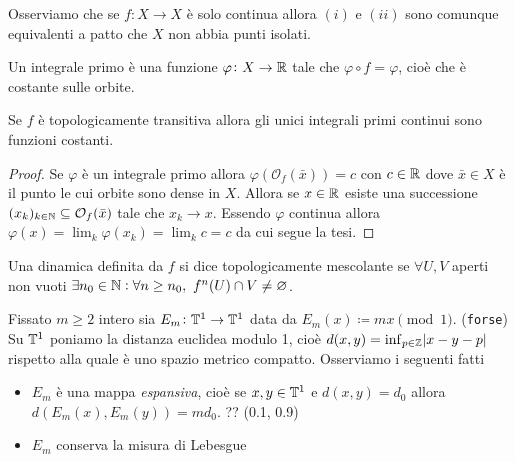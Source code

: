 Osserviamo che se $ f \colon X \to X $ è solo continua allora $ (i) $ e $ (ii) $ sono comunque equivalenti a patto che $ X $ non abbia punti isolati. \\

\begin{definition}
	Un integrale primo è una funzione $ \varphi \colon X \to \mathbb{R} $ tale che $ \varphi \circ f = \varphi $, cioè che è costante sulle orbite. 
\end{definition}

\begin{proposition}
	Se $ f $ è topologicamente transitiva allora gli unici integrali primi continui sono funzioni costanti.
\end{proposition}
%
\begin{proof}
	Se $ \varphi $ è un integrale primo allora $ \varphi(\mathcal{O}_f(\bar{x})) = c $ con $ c \in \mathbb{R} $ dove $ \bar{x} \in X $ è il punto le cui orbite sono dense in $ X $. Allora se $ x \in \mathbb{R} $ esiste una successione $ (x_k)_{k \in \mathbb{N}} \subseteq \mathcal{O}_f(\bar{x}) $ tale che $ x_k \to x $. Essendo $ \varphi $ continua allora $ \varphi(x) = \lim_{k} \varphi(x_k) = \lim_{k} c = c $ da cui segue la tesi. 
\end{proof}

\begin{definition}
	Una dinamica definita da $ f $ si dice topologicamente mescolante se $ \forall U, V $ aperti non vuoti $ \exists n_0 \in \mathbb{N} : \forall n \geq n_0, \ f^n(U) \cap V \neq \varnothing $. 
\end{definition}

\begin{example}
	Fissato $ m \geq 2 $ intero sia $ E_m \colon \mathbb{T}^1 \to \mathbb{T}^1 $ data da $ E_m(x) \coloneqq mx \pmod{1} $. (\texttt{forse}) Su $ \mathbb{T}^1 $ poniamo la distanza euclidea modulo 1, cioè $ d(x, y) = \inf_{p \in \mathbb{Z}} \abs{x - y - p} $ rispetto alla quale è uno spazio metrico compatto. Osserviamo i seguenti fatti
	\begin{itemize}
		\item $ E_m $ è una mappa \emph{espansiva}, cioè se $ x, y \in \mathbb{T}^1  $ e $ d(x, y) = d_0 $ allora $ d(E_m(x), E_m(y)) = m d_0 $. ?? (0.1, 0.9)
		\item $ E_m $ conserva la misura di Lebesgue 
	\end{itemize}
\end{example}

